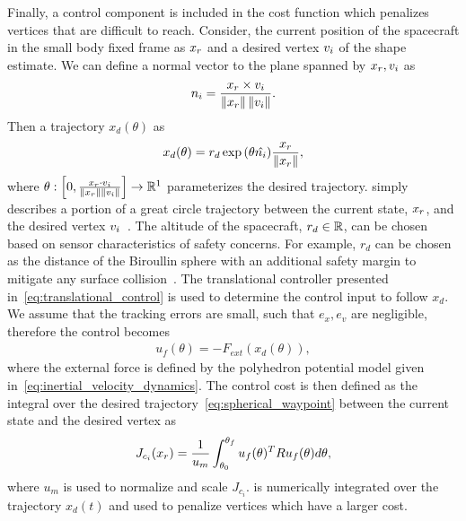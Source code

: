 \documentclass[letterpaper, paper,11pt]{AAS}		%
\begin{document}
Finally, a control component is included in the cost function which penalizes vertices that are difficult to reach.
Consider, the current position of the spacecraft in the small body fixed frame as \( x_r\) and a desired vertex \( v_i \) of the shape estimate.
We can define a normal vector to the plane spanned by \( x_r, v_i \) as
\begin{align}\label{eq:normal_to_plane}
    n_i = \frac{x_r \times v_i}{\left\| x_r \right\| \left\| v_i \right\|}.
\end{align}
Then a trajectory \( x_d(\theta) \) as
\begin{align}\label{eq:spherical_waypoint}
    x_d(\theta) = r_d \exp{\ensuremath{\left( \theta \hat{n_i} \right)} } \frac{x_r}{\left\| x_r \right\|},
\end{align}
where \( \theta : \left[ 0, \frac{x_r \cdot v_i}{\left\| x_r \right\|\left\| v_i \right\|} \right] \to \mathbb{R}^1\) parameterizes the desired trajectory.
 simply describes a portion of a great circle trajectory between the current state, \( x_r \), and the desired vertex \( v_i \)~\cite{chen2016}.
The altitude of the spacecraft, \( r_d \in \mathbb{R} \), can be chosen based on sensor characteristics of safety concerns.
For example, \( r_d \) can be chosen as the distance of the Biroullin sphere with an additional safety margin to mitigate any surface collision~\cite{scheeres2012a}.
The translational controller presented in~\cref{eq:translational_control} is used to determine the control input to follow \( x_d\).
We assume that the tracking errors are small, such that \( e_x, e_v \) are negligible, therefore the control becomes
\begin{align}\label{eq:tracking_control_cost}
    u_f(\theta) = -F_{ext}(x_d(\theta)), 
\end{align}
where the external force is defined by the polyhedron potential model given in~\cref{eq:inertial_velocity_dynamics}.
The control cost is then defined as the integral over the desired trajectory~\cref{eq:spherical_waypoint} between the current state and the desired vertex as
\begin{align}\label{eq:control_cost}
    J_{c_i}(x_r) = \frac{1}{u_m} \int_{\theta_0}^{\theta_f} u_f(\theta)^T R u_f(\theta) d\theta,
\end{align}
where \( u_m \) is used to normalize and scale \( J_{c_i} \).
 is numerically integrated over the trajectory \( x_d(t) \) and used to penalize vertices which have a larger cost.
\end{document}

